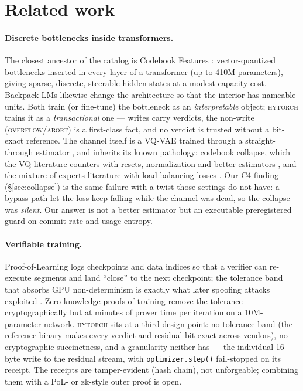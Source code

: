 \documentclass[10pt,twocolumn]{article}
\newcommand{\sys}{\textsc{hytorch}}
\begin{document}
\section{Related work}
\label{sec:related}

\paragraph{Discrete bottlenecks inside transformers.} The closest ancestor
of the catalog is Codebook Features \cite{tamkin2024codebook}: vector-quantized
bottlenecks inserted in every layer of a transformer (up to 410M
parameters), giving sparse, discrete, steerable hidden states at a modest
capacity cost. Backpack LMs \cite{hewitt2023backpack} likewise change the
architecture so that the interior has nameable units. Both train (or
fine-tune) the bottleneck as an \emph{interpretable} object; \sys{} trains it
as a \emph{transactional} one --- writes carry verdicts, the non-write
(\textsc{overflow}/\textsc{abort}) is a first-class fact, and no verdict is
trusted without a bit-exact reference. The channel itself is a VQ-VAE
\cite{oord2017vqvae} trained through a straight-through estimator
\cite{bengio2013ste}, and inherits its known pathology: codebook collapse,
which the VQ literature counters with resets, normalization and better
estimators \cite{huh2023ste}, and the mixture-of-experts literature with
load-balancing losses \cite{shazeer2017moe,fedus2022switch}. Our C4 finding
(\S\ref{sec:collapse}) is the same failure with a twist those settings do not
have: a bypass path let the loss keep falling while the channel was dead, so
the collapse was \emph{silent}. Our answer is not a better estimator but an
executable preregistered guard on commit rate and usage entropy.

\paragraph{Verifiable training.} Proof-of-Learning \cite{jia2021pol} logs
checkpoints and data indices so that a verifier can re-execute segments and
land ``close'' to the next checkpoint; the tolerance band that absorbs GPU
non-determinism is exactly what later spoofing attacks exploited
\cite{zhang2022polattack,fang2023polbroken}. Zero-knowledge proofs of
training \cite{abbaszadeh2024zkpot} remove the tolerance cryptographically
but at minutes of prover time per iteration on a 10M-parameter network. \sys{}
sits at a third design point: no tolerance band (the reference binary makes
every verdict and residual bit-exact across vendors), no cryptographic
succinctness, and a granularity neither has --- the individual 16-byte write
to the residual stream, with \texttt{optimizer.step()} fail-stopped on its
receipt. The receipts are tamper-evident (hash chain), not unforgeable;
combining them with a PoL- or zk-style outer proof is open.
\end{document}
